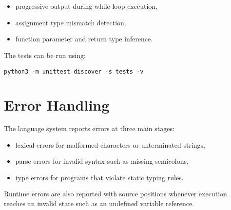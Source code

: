 \begin{itemize}
	\item progressive output during while-loop execution,
	\item assignment type mismatch detection,
	\item function parameter and return type inference.
\end{itemize}

The tests can be run using:

\begin{lstlisting}
python3 -m unittest discover -s tests -v
\end{lstlisting}

\section{Error Handling}
The language system reports errors at three main stages:

\begin{itemize}
	\item lexical errors for malformed characters or unterminated strings,
	\item parse errors for invalid syntax such as missing semicolons,
	\item type errors for programs that violate static typing rules.
\end{itemize}

Runtime errors are also reported with source positions whenever execution
reaches an invalid state such as an undefined variable reference.

